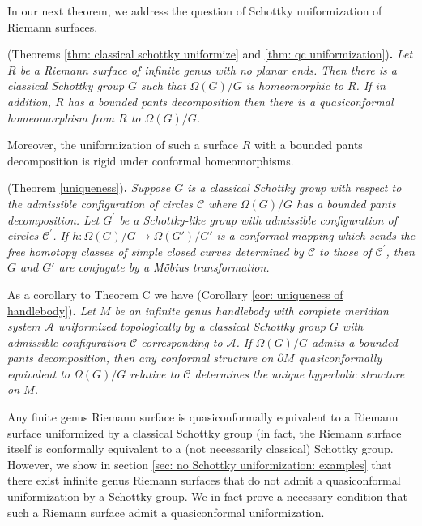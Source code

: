 \documentclass[12pt]{amsart}
\theoremstyle{plain}
\begin{document}
In our next theorem, we address the question of Schottky uniformization of Riemann surfaces. 

\vskip10pt
 (Theorems \ref{thm: classical schottky uniformize} and \ref{thm: qc uniformization}){\bf .}
{\it  Let $R$ be a Riemann surface of infinite genus with no planar ends.  Then 
  there is a classical Schottky group $G$ such that 
 $\Omega(G)/G$ is homeomorphic to $R$.
  If in addition, $R$ has a bounded pants decomposition then there is a quasiconformal homeomorphism from $R$ to 
$\Omega(G)/G$.
}
\vskip10pt

Moreover, the uniformization of such a surface $R$ with a bounded pants decomposition
is rigid under conformal homeomorphisms.

\vskip10pt
 (Theorem \ref{uniqueness}){\bf .}
{\it  Suppose $G$  is a classical Schottky group with respect to the admissible configuration of circles $\mathcal{C}$ where   
 $\Omega(G)/G$ has  a bounded pants decomposition. Let 
 $G^{\prime}$ be a Schottky-like group with admissible configuration of circles $\mathcal{C}^{\prime}$. If 
 $h:\Omega(G)/G \to \Omega(G')/G'$ is a conformal mapping which sends the  free homotopy classes of simple closed curves determined by 
$\mathcal C$  to those of $\mathcal{C}^{\prime}$,  then $G$ and $G'$ are conjugate by a M\"obius transformation.}

\vskip10pt
As a corollary to Theorem C we have
\vskip10pt 
 (Corollary \ref{cor: uniqueness of handlebody}){\bf .}
{\it   Let $M$ be an infinite genus handlebody with  complete
meridian system $\mathcal A$ uniformized topologically by
a classical Schottky group $G$ with  admissible configuration $\mathcal C$ corresponding to $\mathcal A$. If $\Omega(G)/G$ admits a bounded pants decomposition,
then any conformal structure on $\partial M$ quasiconformally equivalent to $\Omega(G)/G$
relative to $\mathcal C$ determines the unique hyperbolic structure on $M$.}
\vskip10pt

Any finite genus Riemann surface is quasiconformally equivalent to a Riemann surface uniformized by a classical Schottky group (in fact, the Riemann surface itself is conformally equivalent to a (not necessarily classical) Schottky group. However, we show in section \ref{sec: no Schottky uniformization: examples} that there exist infinite genus  Riemann surfaces that do not admit a quasiconformal uniformization by a Schottky group. We in fact prove a necessary condition that such a Riemann surface 
admit a quasiconformal uniformization.
\end{document}
